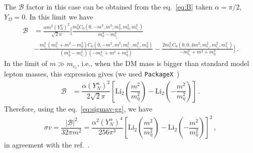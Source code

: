 \documentclass[12pt,letterpaper]{article}
\begin{document}
The $\mathcal{B}$ factor in this case can be obtained from the eq.~\ref{eq:B} taken $\alpha =\pi/2$, $Y_{\Omega}=0$. In this limit we have
%
\begin{align}
\mathcal{B} &=
\frac{\alpha  m^2 (Y_N^{\alpha })^2}{\sqrt{2} \pi }\bigg[
\frac{m_{\eta }^2 C_0\left(0,-m^2,m^2;m_{\eta }^2,m_{\eta }^2,m_{e_i}^2\right)}{m_{\eta }^2-m_{e_i}^2}\nonumber\\
&-\frac{m_{e_i}^2 \left(m_{e_i}^2+m^2-m_{\eta }^2\right) C_0\left(0,-m^2,m^2;m_{e_i}^2,m_{e_i}^2,m_{\eta
   }^2\right)}{\left(m_{\eta }^2-m_{e_i}^2\right) \left(-m_{e_i}^2+m^2+m_{\eta }^2\right)}-\frac{2 m_{e_i}^2 C_0\left(0,0,4 m^2;m_{e_i}^2,m_{e_i}^2,m_{e_i}^2\right)}{-m_{e_i}^2+m^2+m_{\eta }^2}\bigg]\,.
\end{align}
%
In the limit of $m\gg m_{e_i}$, i.e., when the DM mass is bigger than  standard model lepton masses, this expression gives (we used \texttt{PackageX}~\cite{Patel:2015tea})
%
\begin{align}
\mathcal{B} &=
\dfrac{\alpha(Y_N^{\alpha })^2}{2\sqrt{2}\pi}
\left[\text{Li}_2\left(\dfrac{m^2}{m_{\eta}^2}\right)-\text{Li}_2\left(-\dfrac{m^2}{m_{\eta}^2}\right)\right]\,.
\end{align}
Therefore, using the eq.~\ref{eq:sigmav-gg}, we have
%
\begin{align}
\sigma v = \dfrac{|\mathcal{B}|^2}{32\pi m^2}=\dfrac{\alpha^2(Y_N^{\alpha })^4}{256\pi^3}\left[\text{Li}_2\left(\dfrac{m^2}{m_{\eta}^2}\right)-\text{Li}_2\left(-\dfrac{m^2}{m_{\eta}^2}\right)\right]^2\,,
\end{align}
in agreement with the ref.~\cite{Garny:2015wea}.
\end{document}
